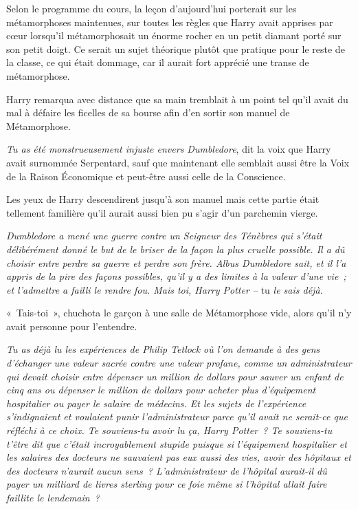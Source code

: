 Selon le programme du cours, la leçon d'aujourd'hui porterait sur les métamorphoses maintenues, sur toutes les règles que Harry avait apprises par cœur lorsqu'il métamorphosait un énorme rocher en un petit diamant porté sur son petit doigt. Ce serait un sujet théorique plutôt que pratique pour le reste de la classe, ce qui était dommage, car il aurait fort apprécié une transe de métamorphose.

Harry remarqua avec distance que sa main tremblait à un point tel qu'il avait du mal à défaire les ficelles de sa bourse afin d'en sortir son manuel de Métamorphose.

\emph{Tu as été monstrueusement injuste envers Dumbledore}, dit la voix que Harry avait surnommée Serpentard, sauf que maintenant elle semblait aussi être la Voix de la Raison Économique et peut-être aussi celle de la Conscience.

Les yeux de Harry descendirent jusqu'à son manuel mais cette partie était tellement familière qu'il aurait aussi bien pu s'agir d'un parchemin vierge.

\emph{Dumbledore a mené une guerre contre un Seigneur des Ténèbres qui s'était délibérément donné le but de le briser de la façon la plus cruelle possible. Il a dû choisir entre perdre sa guerre et perdre son frère. Albus Dumbledore sait, et il l'a appris de la pire des façons possibles, qu'il y a des limites à la valeur d'une vie~; et l'admettre a failli le rendre fou. Mais toi, Harry Potter --} tu \emph{le sais déjà.}

«~Tais-toi~», chuchota le garçon à une salle de Métamorphose vide, alors qu'il n'y avait personne pour l'entendre.

\emph{Tu as déjà lu les expériences de Philip Tetlock où l'on demande à des gens d'échanger une valeur sacrée contre une valeur profane, comme un administrateur qui devait choisir entre dépenser un million de dollars pour sauver un enfant de cinq ans ou dépenser le million de dollars pour acheter plus d'équipement hospitalier ou payer le salaire de médecins. Et les sujets de l'expérience s'indignaient et voulaient punir l'administrateur parce qu'il avait ne serait-ce que réfléchi à ce choix. Te souviens-tu avoir lu ça, Harry Potter~? Te souviens-tu t'être dit que c'était incroyablement stupide puisque si l'équipement hospitalier et les salaires des docteurs ne sauvaient pas eux aussi des vies, avoir des hôpitaux et des docteurs n'aurait aucun sens~? L'administrateur de l'hôpital aurait-il dû payer un milliard de livres sterling pour ce foie même si l'hôpital allait faire faillite le lendemain~?}

